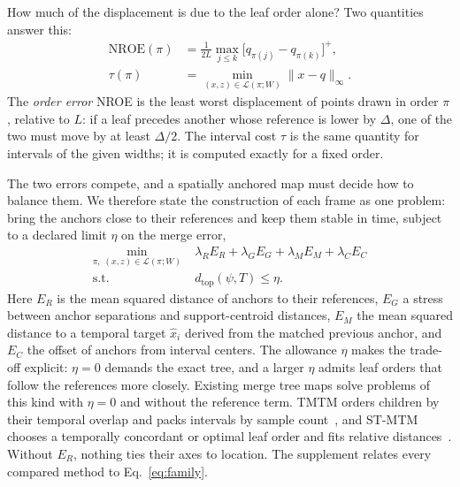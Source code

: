 \documentclass[preprint]{vgtc}   %
\newcommand{\dtop}{d_{\mathrm{top}}}
\newcommand{\nroe}{\mathrm{NROE}}
\begin{document}
How much of the displacement is due to the leaf order alone? Two quantities answer this:
\begin{equation}\label{eq:nroe}
\begin{aligned}
 \nroe(\pi)&=\frac{1}{2L}\max_{j\le k}\bigl[q_{\pi(j)}-q_{\pi(k)}\bigr]^+,\\
 \tau(\pi)&=\min_{(x,z)\in\mathcal{L}(\pi;W)}\|x-q\|_\infty .
\end{aligned}
\end{equation}
The \emph{order error} NROE is the least worst displacement of points drawn in order $\pi$, relative to $L$: if a leaf precedes another whose reference is lower by $\Delta$, one of the two must move by at least $\Delta/2$. The interval cost $\tau$ is the same quantity for intervals of the given widths; it is computed exactly for a fixed order.

The two errors compete, and a spatially anchored map must decide how to balance them. We therefore state the construction of each frame as one problem: bring the anchors close to their references and keep them stable in time, subject to a declared limit $\eta$ on the merge error,
\begin{equation}\label{eq:family}
\begin{aligned}
 \min_{\pi,\;(x,z)\in\mathcal{L}(\pi;W)}\;&\lambda_R E_R+\lambda_G E_G+\lambda_M E_M+\lambda_C E_C\\
 \mathrm{s.t.}\;&\dtop(\psi,T)\le\eta .
\end{aligned}
\end{equation}
Here $E_R$ is the mean squared distance of anchors to their references, $E_G$ a stress between anchor separations and support-centroid distances, $E_M$ the mean squared distance to a temporal target $\hat x_i$ derived from the matched previous anchor, and $E_C$ the offset of anchors from interval centers. The allowance $\eta$ makes the trade-off explicit: $\eta=0$ demands the exact tree, and a larger $\eta$ admits leaf orders that follow the references more closely. Existing merge tree maps solve problems of this kind with $\eta=0$ and without the reference term. TMTM orders children by their temporal overlap and packs intervals by sample count~\cite{Koepp:2023:TMTM}, and ST-MTM chooses a temporally concordant or optimal leaf order and fits relative distances~\cite{STMTM:2026}. Without $E_R$, nothing ties their axes to location. The supplement relates every compared method to Eq.~\ref{eq:family}.
\end{document}
